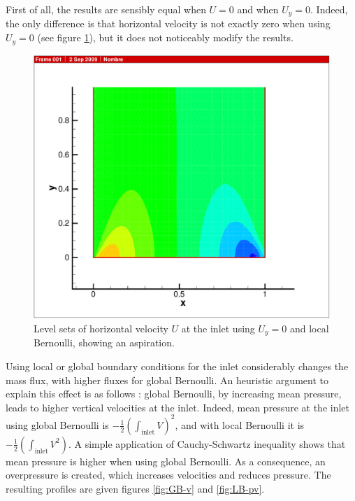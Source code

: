 \documentclass[12pt]{article}
\begin{document}


First of all, the results are sensibly equal when $U = 0$ and when
$U_y = 0$. Indeed, the only difference is that horizontal velocity
is not exactly zero when using $U_y = 0$ (see figure \ref{fig:LB-0-0-u-bas}), but it does not noticeably
modify the results.

\begin{figure}[h!]
\centering
\includegraphics[width=\textwidth]{figs/LB-0-0-u-bas}
\caption{Level sets of horizontal velocity $U$ at the inlet using
  $U_{y} = 0$ and local Bernoulli, showing an aspiration.}
\label{fig:LB-0-0-u-bas}
\end{figure}


Using local or global boundary conditions for the inlet considerably
changes the mass flux, with higher fluxes for global Bernoulli. An
heuristic argument to explain this effect is as follows : global
Bernoulli, by increasing mean pressure, leads to higher vertical
velocities at the inlet. Indeed, mean pressure at the inlet using
global Bernoulli is $- \frac 1 2 (\int_{\text{inlet}} V)^{2}$, and
with local Bernoulli it is $- \frac 1 2 (\int_{\text{inlet}}
V^{2})$. A simple application of Cauchy-Schwartz inequality shows that
mean pressure is higher when using global Bernoulli. As a consequence,
an overpressure is created, which increases velocities and reduces
pressure. The resulting profiles are given figures \ref{fig:GB-v} and
\ref{fig:LB-pv}.
\end{document}
